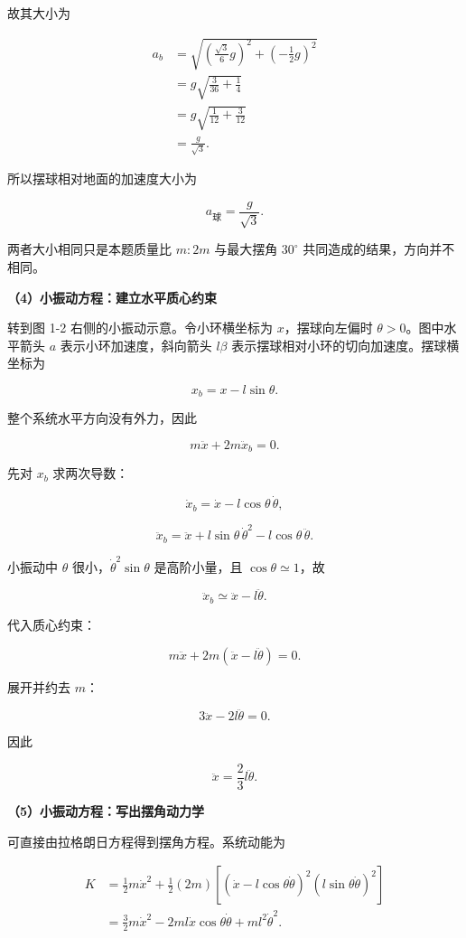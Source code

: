 \documentclass[12pt,a4paper,UTF8]{ctexart}
\begin{document}
故其大小为

\[
\begin{aligned}
a_b
&=\sqrt{\left(\frac{\sqrt3}{6}g\right)^2+
\left(-\frac12g\right)^2}\\
&=g\sqrt{\frac{3}{36}+\frac14}\\
&=g\sqrt{\frac1{12}+\frac3{12}}\\
&=\frac{g}{\sqrt3}.
\end{aligned}
\]

所以摆球相对地面的加速度大小为

\[
\boxed{a_{\text{球}}=\frac{g}{\sqrt3}}.
\]

两者大小相同只是本题质量比 \(m:2m\) 与最大摆角 \(30^\circ\)
共同造成的结果，方向并不相同。

\textbf{（4）小振动方程：建立水平质心约束}

转到图 1-2 右侧的小振动示意。令小环横坐标为 \(x\)，摆球向左偏时
\(\theta>0\)。图中水平箭头 \(a\) 表示小环加速度，斜向箭头 \(l\beta\)
表示摆球相对小环的切向加速度。摆球横坐标为

\[x_b=x-l\sin\theta.\]

整个系统水平方向没有外力，因此

\[
m\ddot x+2m\ddot x_b=0.
\]

先对 \(x_b\) 求两次导数：

\[
\dot x_b=\dot x-l\cos\theta\,\dot\theta,
\]

\[
\ddot x_b
=\ddot x+l\sin\theta\,\dot\theta^2-l\cos\theta\,\ddot\theta.
\]

小振动中 \(\theta\) 很小，\(\dot\theta^2\sin\theta\) 是高阶小量，且
\(\cos\theta\simeq1\)，故

\[
\ddot x_b\simeq\ddot x-l\ddot\theta.
\]

代入质心约束：

\[
m\ddot x+2m(\ddot x-l\ddot\theta)=0.
\]

展开并约去 \(m\)：

\[
3\ddot x-2l\ddot\theta=0.
\]

因此

\[
\boxed{\ddot x=\frac23l\ddot\theta}.
\]

\textbf{（5）小振动方程：写出摆角动力学}

可直接由拉格朗日方程得到摆角方程。系统动能为

\[
\begin{aligned}
K
&=\frac12m\dot x^2
+\frac12(2m)\left[
(\dot x-l\cos\theta\dot\theta)^2
(l\sin\theta\dot\theta)^2\right]\\
&=\frac32m\dot x^2
-2ml\dot x\cos\theta\dot\theta
+ml^2\dot\theta^2.
\end{aligned}
\]
\end{document}

